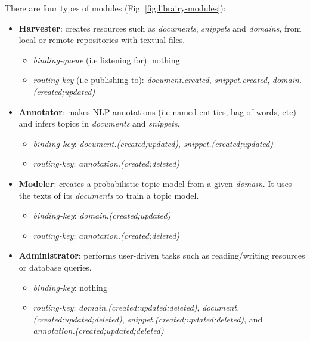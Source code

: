 There are four types of modules (Fig. \ref{fig:librairy-modules}):
\begin{itemize}
	\item \textbf{Harvester}: creates resources such as \textit{documents}, \textit{snippets} and \textit{domains}, from local or remote repositories with textual files.
    \begin{itemize}[rightmargin=\dimexpr\linewidth-5cm-\leftmargin\relax]
    		\item \textit{binding-queue} (i.e listening for): nothing
		\item \textit{routing-key} (i.e publishing to): \textit{document.created}, \textit{snippet.created}, \textit{domain.(created;updated)}
    \end{itemize}
    \item \textbf{Annotator}: makes NLP annotations (i.e named-entities, bag-of-words, etc) and infers topics in \textit{documents} and \textit{snippets}. 
    \begin{itemize}[rightmargin=\dimexpr\linewidth-5cm-\leftmargin\relax]
    	\item \textit{binding-key}: \textit{document.(created;updated)}, \textit{snippet.(created;updated)}
		\item \textit{routing-key}: \textit{annotation.(created;deleted)}
    \end{itemize}
    \item \textbf{Modeler}: creates a probabilistic topic model from a given \textit{domain}. It uses the texts of its \textit{documents} to train a topic model.
    \begin{itemize}[rightmargin=\dimexpr\linewidth-5cm-\leftmargin\relax]
    	\item \textit{binding-key}: \textit{domain.(created;updated)}
		\item \textit{routing-key}: \textit{annotation.(created;deleted)}	
	\end{itemize}
	\item \textbf{Administrator}: performs user-driven tasks such as reading/writing resources or database queries.	
    \begin{itemize}[rightmargin=\dimexpr\linewidth-5cm-\leftmargin\relax]
    	\item \textit{binding-key}: nothing
		\item \textit{routing-key}: \textit{domain.(created;updated;deleted)}, \textit{document.(created;updated;deleted)}, \textit{snippet.(created;updated;deleted)}, and \textit{annotation.(created;updated;deleted)}
    \end{itemize}
\end{itemize}

